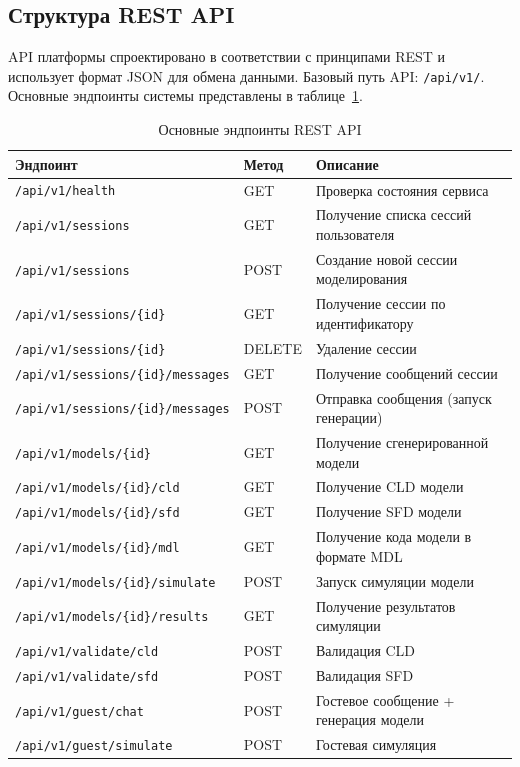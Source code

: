 \subsection{Структура REST API}

API платформы спроектировано в соответствии с принципами REST и использует формат JSON для обмена данными. Базовый путь API: \texttt{/api/v1/}. Основные эндпоинты системы представлены в таблице~\ref{tab:api-endpoints}.

\begin{table}[H]
    \centering
    \caption{Основные эндпоинты REST API}
    \label{tab:api-endpoints}
    \begin{tabular}{|p{4.5cm}|p{1.8cm}|p{7.5cm}|}
        \hline
        \textbf{Эндпоинт} & \textbf{Метод} & \textbf{Описание} \\
        \hline
        \texttt{/api/v1/health} & GET & Проверка состояния сервиса \\
        \hline
        \texttt{/api/v1/sessions} & GET & Получение списка сессий пользователя \\
        \hline
        \texttt{/api/v1/sessions} & POST & Создание новой сессии моделирования \\
        \hline
        \texttt{/api/v1/sessions/\{id\}} & GET & Получение сессии по идентификатору \\
        \hline
        \texttt{/api/v1/sessions/\{id\}} & DELETE & Удаление сессии \\
        \hline
        \texttt{/api/v1/sessions/\{id\}/messages} & GET & Получение сообщений сессии \\
        \hline
        \texttt{/api/v1/sessions/\{id\}/messages} & POST & Отправка сообщения (запуск генерации) \\
        \hline
        \texttt{/api/v1/models/\{id\}} & GET & Получение сгенерированной модели \\
        \hline
        \texttt{/api/v1/models/\{id\}/cld} & GET & Получение CLD модели \\
        \hline
        \texttt{/api/v1/models/\{id\}/sfd} & GET & Получение SFD модели \\
        \hline
        \texttt{/api/v1/models/\{id\}/mdl} & GET & Получение кода модели в формате MDL \\
        \hline
        \texttt{/api/v1/models/\{id\}/simulate} & POST & Запуск симуляции модели \\
        \hline
        \texttt{/api/v1/models/\{id\}/results} & GET & Получение результатов симуляции \\
        \hline
        \texttt{/api/v1/validate/cld} & POST & Валидация CLD \\
        \hline
        \texttt{/api/v1/validate/sfd} & POST & Валидация SFD \\
        \hline
        \texttt{/api/v1/guest/chat} & POST & Гостевое сообщение + генерация модели \\
        \hline
        \texttt{/api/v1/guest/simulate} & POST & Гостевая симуляция \\
        \hline
    \end{tabular}
\end{table}


